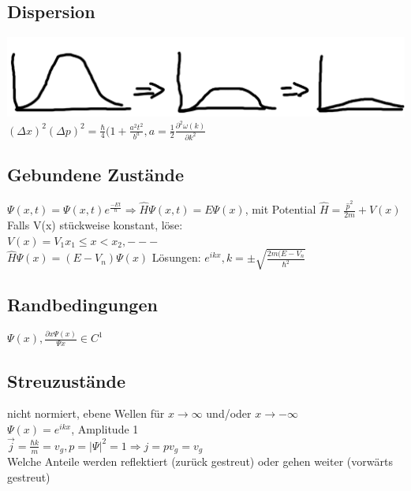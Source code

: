 \documentclass[10pt,a4paper]{article}
\begin{document}
\subsection{Dispersion}
\includegraphics[scale=0.1]{Pictures/Dispersion.jpg}\\
$(\Delta x)^2(\Delta p)^2 = \frac{\hbar}{4}(1+\frac{a^2 t^2}{b^a}, a = \frac{1}{2}\frac{\partial^2\omega(k)}{\partial k^2}$
%
\subsection{Gebundene Zustände}
$\Psi(x,t)=\Psi(x,t)e^{\frac{-Et}{\hbar}}\Rightarrow \hat{H} \Psi(x,t)=E\Psi(x)$, mit Potential $\hat{H}=\frac{\hat{p}^2}{2m}+V(x)$\\
Falls V(x) stückweise konstant, löse:\\
$V(x)=V_1 x_1 \leq x < x_2, ---$\\
$\hat{H}\Psi(x)=(E-V_n)\Psi(x)$ Lösungen: $e^{ikx}, k =\pm\sqrt{\frac{2m(E-V_n}{\hbar^2}}$\\
%
\subsection{Randbedingungen}
$\Psi(x),\frac{\partial x\Psi(x)}{\Psi x} \in C^1$\\
%
\subsection{Streuzustände}
nicht normiert, ebene Wellen für $x\rightarrow \infty$  und/oder $x\rightarrow -\infty$\\
$\Psi(x)=e^{ikx}$, Amplitude 1\\
$\vec{j}=\frac{\hbar k}{m}=v_g, p = |\Psi|^2=1\Rightarrow j = p v_g = v_g$\\
Welche Anteile werden reflektiert (zurück gestreut) oder gehen weiter (vorwärts gestreut)\\
%
\end{document}
